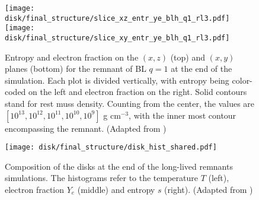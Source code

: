 \begin{figure}[t]
    \centering
    \texttt{[image: disk/final\_structure/slice\_xz\_entr\_ye\_blh\_q1\_rl3.pdf]}
    \texttt{[image: disk/final\_structure/slice\_xy\_entr\_ye\_blh\_q1\_rl3.pdf]}
    \caption{Entropy and electron fraction on the $(x,z)$ (top) and
        $(x,y)$ planes (bottom) for the remnant of BL $q=1$ at the end
        of the simulation. Each plot is divided vertically, with entropy
        being color-coded on the left and electron fraction on the
        right. Solid contours stand for rest muss density. Counting from
        the center, the values are $[10^{13}, 10^{12}, 10^{11}, 10^{10},
        10^{9}]$ g cm$^{-3}$, with the inner most contour encompassing
        the remnant.
        (Adapted from \citet{Nedora:2020pak})
    }  
    \label{fig:snapshots_xy_ye_entr}
\end{figure}

\begin{figure*}[t]
    \centering 
    \texttt{[image: disk/final\_structure/disk\_hist\_shared.pdf]}
    \caption{Composition of the disks at the end of the long-lived
        remnants simulations. The histograms refer to the temperature $T$
        (left),
        electron fraction $Y_e$
        (middle) and entropy $s$ (right).
        (Adapted from \citet{Nedora:2020pak})
    }
    \label{fig:final_disk_struct_hist_long}
\end{figure*}

